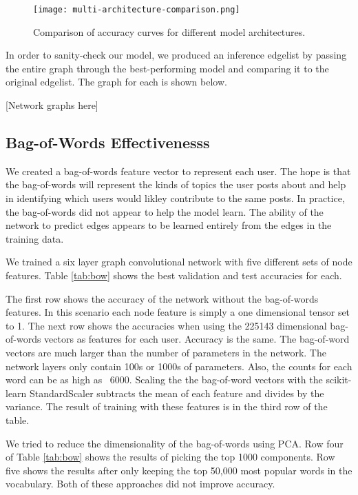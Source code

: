 \documentclass[10pt,twocolumn,letterpaper]{article}
\begin{document}
\begin{figure}[t]
\begin{center}

   \texttt{[image: multi-architecture-comparison.png]}
\end{center}
   \caption{Comparison of accuracy curves for different model architectures.}
\label{fig:long}
\label{fig:onecol}
\end{figure}


In order to sanity-check our model, we produced an inference edgelist by passing the entire graph through the best-performing model and comparing it to the original edgelist. The graph for each is shown below. 

[Network graphs here]

\subsection{Bag-of-Words Effectivenesss}

We created a bag-of-words feature vector to represent each user. The hope is that the bag-of-words will represent the kinds of topics the user posts about and help in identifying which users would likley contribute to the same posts. In practice, the bag-of-words did not appear to help the model learn. The ability of the network to predict edges appears to be learned entirely from the edges in the training data.

We trained a six layer graph convolutional network with five different sets of node features. Table \ref{tab:bow} shows the best validation and test accuracies for each.

The first row shows the accuracy of the network without the bag-of-words features. In this scenario each node feature is simply a one dimensional tensor set to 1.
The next row shows the accuracies when using the 225143 dimensional bag-of-words vectors as features for each user. Accuracy is the same. The bag-of-word vectors are much larger than the number of parameters in the network. 
The network layers only contain 100s or 1000s of parameters.
Also, the counts for each word can be as high as ~6000. Scaling the the bag-of-word vectors with the scikit-learn StandardScaler subtracts the mean of each feature and divides by the variance. The result of training with these features is in the third row of the table.

We tried to reduce the dimensionality of the bag-of-words using PCA. Row four of Table \ref{tab:bow}  shows the results of picking the top 1000 components. Row five shows the results after only keeping the top 50,000 most popular words in the vocabulary.
Both of these approaches did not improve accuracy.
\end{document}
